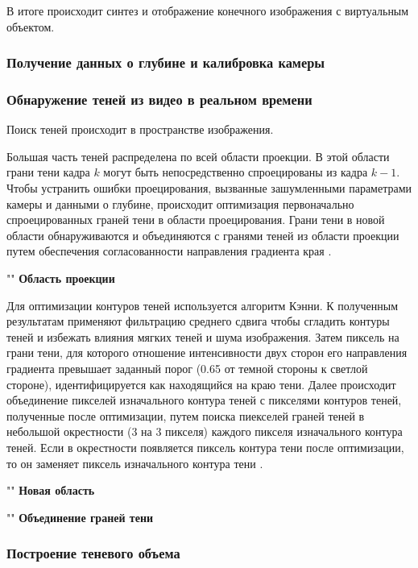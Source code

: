В итоге происходит синтез и отображение конечного изображения с виртуальным объектом.

\subsubsection*{Получение данных о глубине и калибровка камеры}



\subsubsection*{Обнаружение теней из видео в реальном времени}

Поиск теней происходит в пространстве изображения. 

Большая часть теней распределена по всей области проекции. В этой области грани тени кадра $k$ могут быть непосредственно спроецированы из кадра $k - 1$. Чтобы устранить ошибки проецирования, вызванные зашумленными параметрами камеры и данными о глубине, происходит оптимизация первоначально спроецированных граней тени в области проецирования. Грани тени в новой области обнаруживаются и объединяются с гранями теней из области проекции путем обеспечения согласованности направления градиента края \cite{wei2019simulating}.

""\newline
\indent\textbf{Область проекции}

Для оптимизации контуров теней используется алгоритм Кэнни. К полученным результатам применяют фильтрацию среднего сдвига чтобы сгладить контуры теней и избежать влияния мягких теней и шума изображения. Затем пиксель на грани тени, для которого отношение интенсивности двух сторон его направления градиента превышает заданный порог (0.65 от темной стороны к светлой стороне), идентифицируется как находящийся на краю тени. Далее происходит объединение пикселей изначального контура теней с пикселями контуров теней, полученные после оптимизации, путем поиска пиекселей граней теней в небольшой окрестности (3 на 3 пикселя) каждого пикселя изначального контура теней. Если в окрестности появляется пиксель контура тени после оптимизации, то он заменяет пиксель изначального контура тени \cite{wei2019simulating}.

""\newline
\indent\textbf{Новая область}


""\newline
\indent\textbf{Объединение граней тени}


\subsubsection*{Построение теневого объема}



